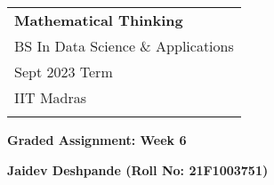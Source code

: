\documentclass[a4paper,12pt]{article} %
\begin{document}
\thispagestyle{empty} %

\begin{tabular}{p{15.5cm}} %
{\large \bf Mathematical Thinking} \\
BS In Data Science \& Applications  \\ Sept 2023 Term  \\ IIT Madras\\
\hline %
\\
\end{tabular} %

\vspace*{0.3cm} %

\begin{center} %
	{\Large \bf Graded Assignment: Week 6} %
	\vspace{2mm}
	
	{\bf Jaidev Deshpande (Roll No: 21F1003751)} %
		
\end{center}  

\vspace{0.4cm}
\end{document}
